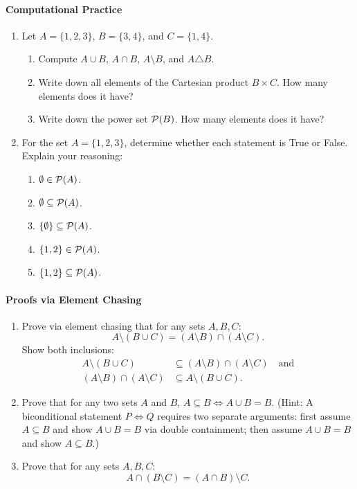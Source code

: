 \paragraph{Computational Practice}
\begin{enumerate}[resume]
\item Let $A = \{1, 2, 3\}$, $B = \{3, 4\}$, and $C = \{1, 4\}$.
\begin{enumerate}[label=(\alph*)]
\item Compute $A \cup B$, $A \cap B$, $A \setminus B$, and $A \triangle B$.
\item Write down all elements of the Cartesian product $B \times C$. How many elements does it have?
\item Write down the power set $\mathcal{P}(B)$. How many elements does it have?
\end{enumerate}

\item For the set $A = \{1, 2, 3\}$, determine whether each statement is True or False. Explain your reasoning:
\begin{enumerate}[label=(\alph*)]
\item $\emptyset \in \mathcal{P}(A)$.
\item $\emptyset \subseteq \mathcal{P}(A)$.
\item $\{\emptyset\} \subseteq \mathcal{P}(A)$.
\item $\{1, 2\} \in \mathcal{P}(A)$.
\item $\{1, 2\} \subseteq \mathcal{P}(A)$.
\end{enumerate}
\end{enumerate}

\paragraph{Proofs via Element Chasing}
\begin{enumerate}[resume]
\item Prove via element chasing that for any sets $A, B, C$:
\[
A \setminus (B \cup C) = (A \setminus B) \cap (A \setminus C).
\]
Show both inclusions:
\begin{align*}
A \setminus (B \cup C) &\subseteq (A \setminus B) \cap (A \setminus C) \quad \text{and} \\
(A \setminus B) \cap (A \setminus C) &\subseteq A \setminus (B \cup C).
\end{align*}

\item Prove that for any two sets $A$ and $B$, $A \subseteq B \iff A \cup B = B$.
(Hint: A biconditional statement $P \iff Q$ requires two separate arguments: first assume $A \subseteq B$ and show $A \cup B = B$ via double containment; then assume $A \cup B = B$ and show $A \subseteq B$.)

\item Prove that for any sets $A, B, C$:
\[
A \cap (B \setminus C) = (A \cap B) \setminus C.
\]
\end{enumerate}

